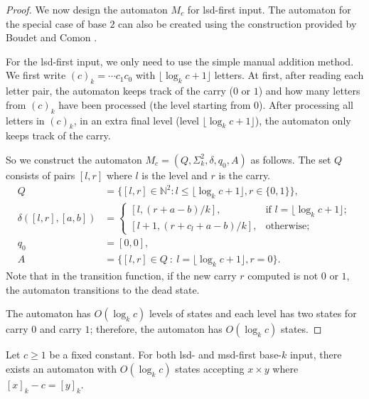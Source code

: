 \documentclass[12pt,reqno]{article}
\def\suchthat{\ : \ }
\begin{document}
\begin{proof}
We now design the automaton $M_c$ for lsd-first input. The automaton for the special case of base $2$ can also be created using the construction provided by Boudet and Comon \cite{boudet_diophantine_1996}.


For the lsd-first input, we only need to use the simple manual addition method. We first write $(c)_k = \cdots c_1 c_0$ with $\lfloor \log_k c +1\rfloor$ letters. At first, after reading each letter pair, the automaton keeps track of the carry ($0$ or $1$) and how many letters from $(c)_k$ have been processed (the level starting from $0$). After processing all letters in $(c)_k$, in an extra final level (level $\lfloor \log_k c + 1 \rfloor$), the automaton only keeps track of the carry.

So we construct the automaton $M_c=(Q, \Sigma^2_k, \delta, q_0, A)$ as follows. The set $Q$ consists of pairs $[l, r]$ where $l$ is the level and $r$ is the carry.
\begin{align*}
Q &= \{[l, r] \in \mathbb{N}^2: l \leq \lfloor \log_k c + 1 \rfloor, r \in \{0, 1\}\}, \\
\delta([l, r], [a, b]) &=
\begin{cases}
    [l, (r+a - b)/k], &  \text{if $l= \lfloor \log_k c + 1 \rfloor $}; \\
    [l+1, (r + c_l + a - b)/k], & \text{otherwise;}
\end{cases}
 \\
q_0 &= [0, 0], \\
A &= \{ [l, r] \in Q \suchthat l= \lfloor \log_k c + 1 \rfloor, r=0\}.
\end{align*}
Note that in the transition function, if the new carry $r$ computed is not $0$ or $1$, the automaton transitions to the dead state.

The automaton has $O(\log_k c)$ levels of states and each level has two states for carry $0$ and carry $1$; therefore, the automaton has $O(\log _k c)$ states.
\end{proof}

\begin{theorem}
    Let $c \geq 1$ be a fixed constant.
    For both lsd- and msd-first base-$k$ input, there exists an automaton with  $O(\log_k c)$
    states accepting $x \times y$ where $[x]_k - c = [y]_k$.
\end{theorem}
\end{document}
